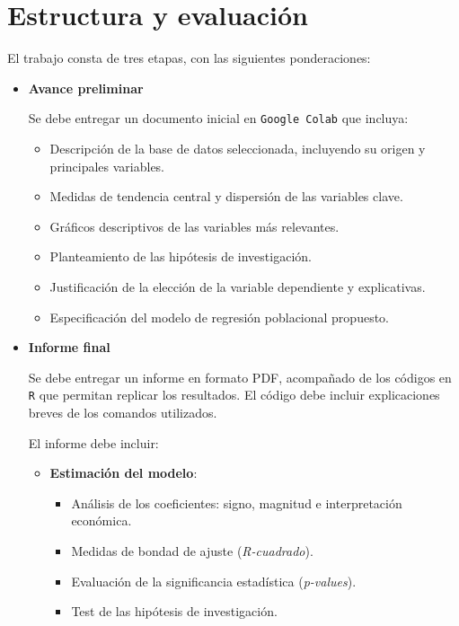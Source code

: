 \documentclass[11pt,a4paper]{article}
\begin{document}
\section*{Estructura y evaluación}

El trabajo consta de tres etapas, con las siguientes ponderaciones:

\begin{itemize}
    \item \textbf{Avance preliminar}
    
    Se debe entregar un documento inicial en \texttt{Google Colab} que incluya:
    \begin{itemize}
        \item Descripción de la base de datos seleccionada, incluyendo su origen y principales variables.
        \item Medidas de tendencia central y dispersión de las variables clave.
        \item Gráficos descriptivos de las variables más relevantes.
        \item Planteamiento de las hipótesis de investigación.
        \item Justificación de la elección de la variable dependiente y explicativas.
        \item Especificación del modelo de regresión poblacional propuesto.
    \end{itemize}
    
    \item \textbf{Informe final}

    Se debe entregar un informe en formato PDF, acompañado de los códigos en \texttt{R} que permitan replicar los resultados. El código debe incluir explicaciones breves de los comandos utilizados.
    
    El informe debe incluir:
    
    \begin{itemize}
        \item \textbf{Estimación del modelo}: 
        \begin{itemize}
            \item Análisis de los coeficientes: signo, magnitud e interpretación económica.
            \item Medidas de bondad de ajuste (\textit{R-cuadrado}).
            \item Evaluación de la significancia estadística (\textit{p-values}).
            \item Test de las hipótesis de investigación.
        \end{itemize}


\end{itemize}
\end{itemize}
\end{document}
